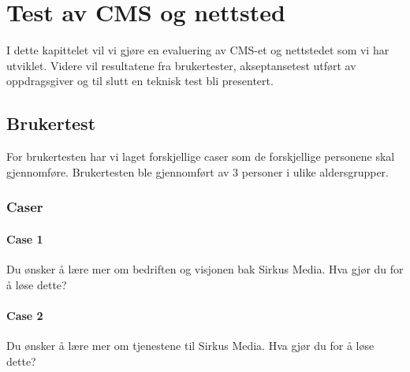 \cleardoublepage
\chapter{Test av CMS og nettsted}
\label{chap:evaluation} 


I dette kapittelet vil vi gjøre en evaluering av CMS-et og nettstedet som vi har utviklet. Videre vil resultatene fra brukertester, akseptansetest utført av oppdragsgiver og til slutt en teknisk test bli presentert.

\section{Brukertest}
For brukertesten har vi laget forskjellige caser som de forskjellige personene skal gjennomføre. Brukertesten ble gjennomført av 3 personer i ulike aldersgrupper.

\subsection{Caser}

\subsubsection{Case 1}
Du ønsker å lære mer om bedriften og visjonen bak Sirkus Media. Hva gjør du for å løse dette?

\subsubsection{Case 2}
Du ønsker å lære mer om tjenestene til Sirkus Media. Hva gjør du for å løse dette?

